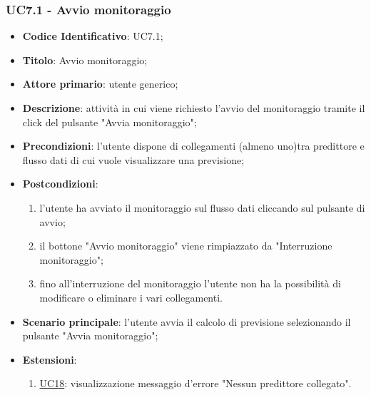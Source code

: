 	\subsubsection{UC7.1 - Avvio monitoraggio}
		\begin{itemize}
			\item\textbf{Codice Identificativo}: UC7.1;
			\item\textbf{Titolo}: Avvio monitoraggio;
			\item\textbf{Attore primario}: utente generico;
			\item\textbf{Descrizione}: attività in cui viene richiesto l'avvio del monitoraggio tramite il click del pulsante "Avvia monitoraggio";
			\item\textbf{Precondizioni}: l'utente dispone di collegamenti (almeno uno)tra predittore e flusso dati di cui vuole visualizzare una previsione;
			\item\textbf{Postcondizioni}:
				\begin{enumerate}
					\item l'utente ha avviato il monitoraggio sul flusso dati cliccando sul pulsante di avvio;
					\item il bottone "Avvio monitoraggio" viene rimpiazzato da "Interruzione monitoraggio";
					\item fino all'interruzione del monitoraggio l'utente non ha la possibilità di modificare o eliminare i vari collegamenti.
				\end{enumerate}
			\item\textbf{Scenario principale}: l'utente avvia il calcolo di previsione selezionando il pulsante "Avvia monitoraggio";
			\item\textbf{Estensioni}:
				\begin{enumerate}
					\item \hyperref[par:UC18]{UC18}: visualizzazione messaggio d'errore "Nessun predittore collegato".
				\end{enumerate}	
		\end{itemize}	
		
		\label{par:UC7.2}
